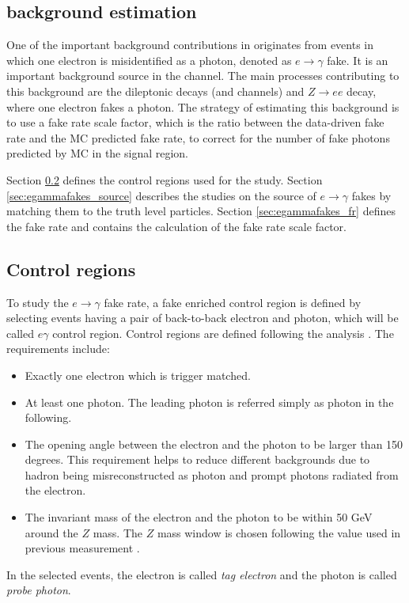 \subsection{\efake background estimation}
\label{sec:background-estimation-efake}
One of the important background contributions in \tty originates from events in which one electron is misidentified as a photon, denoted as $e\to\gamma$ fake. It is an important background source in the \ljets channel. The main processes contributing to this background are the \ttbar dileptonic decays (\chee and \chemu channels) and $Z\to ee$ decay, where one electron fakes a photon. The strategy of estimating this background is to use a fake rate scale factor, which is the ratio between the data-driven fake rate and the MC predicted fake rate, to correct for the number of fake photons predicted by MC in the signal region.


Section \ref{sec:egammafakes_cr} defines the control regions used for the study. 
Section \ref{sec:egammafakes_source} describes the studies on the source of $e\to\gamma$ fakes by matching them to the truth level particles. Section \ref{sec:egammafakes_fr} defines the fake rate and contains the calculation of the fake rate scale factor.

\subsection{Control regions}
\label{sec:egammafakes_cr}

To study the $e\to\gamma$ fake rate, a fake enriched control region is defined by selecting events having a pair of back-to-back electron and photon, which will be called $e\gamma$ control region. Control regions are defined following the analysis \cite{Batool:2266485}.
The requirements include:
\begin{itemize}
\item Exactly one electron which is trigger matched.
\item At least one photon. The leading \pt photon is referred simply as photon in the following.
\item The opening angle between the electron and the photon to be larger than 150 degrees. This requirement helps to reduce different backgrounds due to hadron being misreconstructed as photon and prompt photons radiated from the electron.
\item The invariant mass of the electron and the photon to be within 50 GeV around the $Z$ mass. The $Z$ mass window is chosen following the value used in previous measurement \cite{Batool:2266485}.
\end{itemize}
In the selected events, the electron is called \textit{tag electron} and the photon is called \textit{probe photon}.


